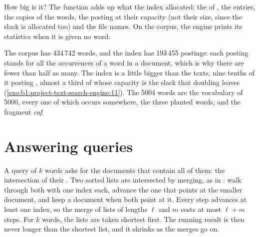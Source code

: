 How big is it? The function  adds up what the index allocated: the  of , the entries,
the copies of the words, the posting  at their capacity (not their size, since the slack is allocated too) and the
file names. On the corpus, the engine prints its statistics when it is given no word:

\label{out:b1:project-text-search-engine:stats}

The corpus has 434\,742 words, and the index has 193\,455 postings: each posting stands for all the occurrences of a word
in a document, which is why there are fewer than half as many. The index is a little bigger than the texts, nine tenths of it
posting , almost a third of whose capacity is the slack that doubling leaves (\cref{exo:b1:project-text-search-engine:11}).
The 5004 words are the vocabulary of 5000, every one of which occurs somewhere, the three planted words, and the
fragment \emph{caf}.

\section{Answering queries}\label{sec:b1:project-text-search-engine:queries}

A query of $k$ words asks for the documents that contain all of them: the intersection of their . Two
sorted lists are intersected by merging, as in : walk through both with one index each, advance the one that
points at the smaller document, and keep a document when both point at it. Every step advances at least one index, so
the merge of lists of lengths $\ell$ and $m$ costs at most $\ell + m$ steps. For $k$ words, the lists are taken
shortest first. The running result is then never longer than the shortest list, and it shrinks as the merges go on.

